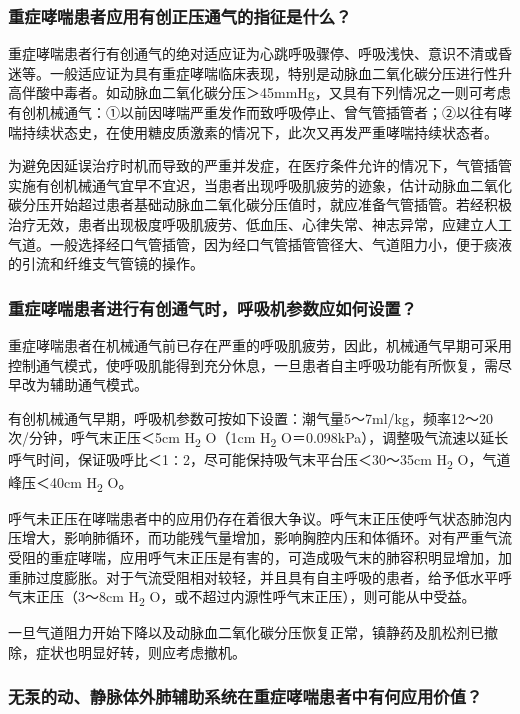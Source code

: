 \subsubsection{重症哮喘患者应用有创正压通气的指征是什么？}

重症哮喘患者行有创通气的绝对适应证为心跳呼吸骤停、呼吸浅快、意识不清或昏迷等。一般适应证为具有重症哮喘临床表现，特别是动脉血二氧化碳分压进行性升高伴酸中毒者。如动脉血二氧化碳分压＞45mmHg，又具有下列情况之一则可考虑有创机械通气：①以前因哮喘严重发作而致呼吸停止、曾气管插管者；②以往有哮喘持续状态史，在使用糖皮质激素的情况下，此次又再发严重哮喘持续状态者。

为避免因延误治疗时机而导致的严重并发症，在医疗条件允许的情况下，气管插管实施有创机械通气宜早不宜迟，当患者出现呼吸肌疲劳的迹象，估计动脉血二氧化碳分压开始超过患者基础动脉血二氧化碳分压值时，就应准备气管插管。若经积极治疗无效，患者出现极度呼吸肌疲劳、低血压、心律失常、神志异常，应建立人工气道。一般选择经口气管插管，因为经口气管插管管径大、气道阻力小，便于痰液的引流和纤维支气管镜的操作。

\subsubsection{重症哮喘患者进行有创通气时，呼吸机参数应如何设置？}

重症哮喘患者在机械通气前已存在严重的呼吸肌疲劳，因此，机械通气早期可采用控制通气模式，使呼吸肌能得到充分休息，一旦患者自主呼吸功能有所恢复，需尽早改为辅助通气模式。

有创机械通气早期，呼吸机参数可按如下设置：潮气量5～7ml/kg，频率12～20次/分钟，呼气末正压＜5cm
H\textsubscript{2} O（1cm H\textsubscript{2}
O＝0.098kPa），调整吸气流速以延长呼气时间，保证吸呼比＜1∶2，尽可能保持吸气末平台压＜30～35cm
H\textsubscript{2} O，气道峰压＜40cm H\textsubscript{2} O。

呼气未正压在哮喘患者中的应用仍存在着很大争议。呼气末正压使呼气状态肺泡内压增大，影响肺循环，而功能残气量增加，影响胸腔内压和体循环。对有严重气流受阻的重症哮喘，应用呼气末正压是有害的，可造成吸气末的肺容积明显增加，加重肺过度膨胀。对于气流受阻相对较轻，并且具有自主呼吸的患者，给予低水平呼气末正压（3～8cm
H\textsubscript{2} O，或不超过内源性呼气末正压），则可能从中受益。

一旦气道阻力开始下降以及动脉血二氧化碳分压恢复正常，镇静药及肌松剂已撤除，症状也明显好转，则应考虑撤机。

\subsubsection{无泵的动、静脉体外肺辅助系统在重症哮喘患者中有何应用价值？}

